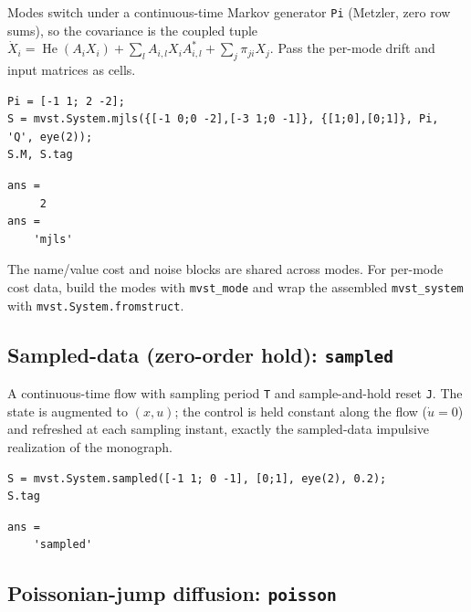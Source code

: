 \documentclass[11pt,oneside]{report}
\newcommand{\code}[1]{\texttt{#1}}
\begin{document}
Modes switch under a continuous-time Markov generator \code{Pi} (Metzler, zero row
sums), so the covariance is the coupled tuple
\(\dot X_i=\operatorname{He}(A_iX_i)+\sum_l A_{i,l}X_iA_{i,l}^{*}+\sum_j\pi_{ji}X_j\).
Pass the per-mode drift and input matrices as cells.

\begin{lstlisting}[style=matlabstyle]
Pi = [-1 1; 2 -2];
S = mvst.System.mjls({[-1 0;0 -2],[-3 1;0 -1]}, {[1;0],[0;1]}, Pi, 'Q', eye(2));
S.M, S.tag
\end{lstlisting}

\begin{lstlisting}[style=outputstyle]
ans =
     2
ans =
    'mjls'
\end{lstlisting}

The name/value cost and noise blocks are shared across modes. For
per-mode cost data, build the modes with \code{mvst\_mode} and wrap the assembled
\code{mvst\_system} with \code{mvst.System.fromstruct}.

\hypertarget{sampled-data-zero-order-hold-sampled}{%
\subsection{\texorpdfstring{Sampled-data (zero-order hold): \code{sampled}}{Sampled-data (zero-order hold): sampled}}\label{sampled-data-zero-order-hold-sampled}}

A continuous-time flow with sampling period \code{T} and sample-and-hold reset \code{J}.
The state is augmented to \((x,u)\); the control is held constant along the flow
(\(\dot u=0\)) and refreshed at each sampling instant, exactly the sampled-data
impulsive realization of the monograph.

\begin{lstlisting}[style=matlabstyle]
S = mvst.System.sampled([-1 1; 0 -1], [0;1], eye(2), 0.2);
S.tag
\end{lstlisting}

\begin{lstlisting}[style=outputstyle]
ans =
    'sampled'
\end{lstlisting}

\hypertarget{poissonian-jump-diffusion-poisson}{%
\subsection{\texorpdfstring{Poissonian-jump diffusion: \code{poisson}}{Poissonian-jump diffusion: poisson}}\label{poissonian-jump-diffusion-poisson}}
\end{document}
